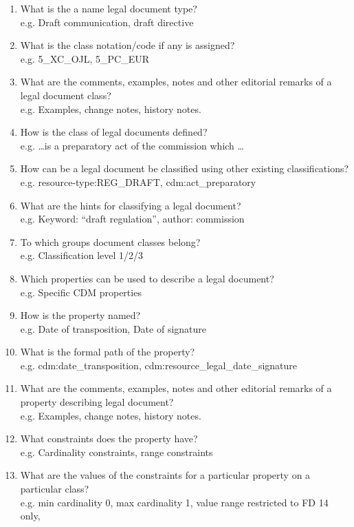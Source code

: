 \begin{enumerate}

\item
  What is the a name legal document type? \\e.g. Draft communication, draft
  directive
\item
  What is the class notation/code if any is assigned?\\e.g. 5\_XC\_OJL, 5\_PC\_EUR
\item
  What are the comments, examples, notes and other editorial remarks of a legal document class?\\e.g. Examples, change notes, history notes.
\item
  How is the class of legal documents defined?\\e.g. \dots is a preparatory act of the commission which \dots
\item
  How can be a legal document be classified using other existing
  classifications?\\e.g. resource-type:REG\_DRAFT, cdm:act\_preparatory
\item
  What are the hints for classifying a legal document?\\e.g. Keyword: ``draft regulation'', author: commission
\item
  To which groups document classes belong?\\e.g. Classification level 1/2/3
\item
  Which properties can be used to describe a legal document?\\e.g. Specific CDM properties
\item
  How is the property named?\\e.g. Date of transposition, Date of signature
\item
  What is the formal path of the property?\\e.g. cdm:date\_transposition,
  cdm:resource\_legal\_date\_signature
\item
  What are the comments, examples, notes and other editorial remarks of a property describing legal document?\\e.g. Examples, change notes, history notes.
\item
  What constraints does the property have?\\e.g. Cardinality constraints, range constraints
\item
  What are the values of the constraints for a particular property on a particular class?\\e.g. min cardinality 0, max cardinality 1, value range restricted to FD 14 only,

\end{enumerate}
